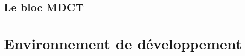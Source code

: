 \documentclass{article}
\begin{document}



    \subsection{Le bloc MDCT}



    \newpage
    \section{Environnement de développement}



\end{document}
